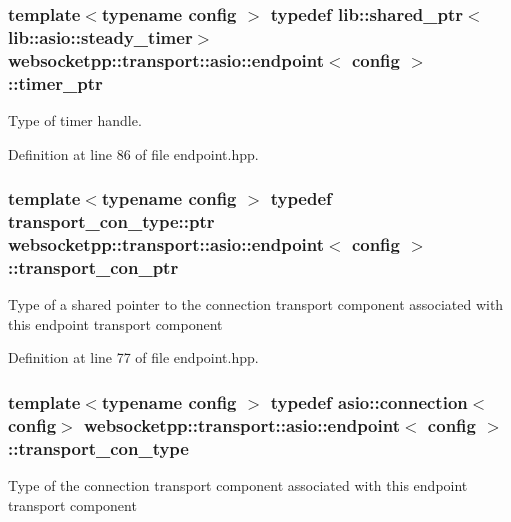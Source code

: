 \subsubsection[{timer\+\_\+ptr}]{\setlength{\rightskip}{0pt plus 5cm}template$<$typename config $>$ typedef lib\+::shared\+\_\+ptr$<${\bf lib\+::asio\+::steady\+\_\+timer}$>$ {\bf websocketpp\+::transport\+::asio\+::endpoint}$<$ config $>$\+::{\bf timer\+\_\+ptr}}\label{classwebsocketpp_1_1transport_1_1asio_1_1endpoint_a1802f5762009dbed117ff793fa87468f}


Type of timer handle. 



Definition at line 86 of file endpoint.\+hpp.

\hypertarget{classwebsocketpp_1_1transport_1_1asio_1_1endpoint_ac5fc306f32d15f92dd1b22366eaba62d}{}
\subsubsection[{transport\+\_\+con\+\_\+ptr}]{\setlength{\rightskip}{0pt plus 5cm}template$<$typename config $>$ typedef {\bf transport\+\_\+con\+\_\+type\+::ptr} {\bf websocketpp\+::transport\+::asio\+::endpoint}$<$ config $>$\+::{\bf transport\+\_\+con\+\_\+ptr}}\label{classwebsocketpp_1_1transport_1_1asio_1_1endpoint_ac5fc306f32d15f92dd1b22366eaba62d}
Type of a shared pointer to the connection transport component associated with this endpoint transport component 

Definition at line 77 of file endpoint.\+hpp.

\hypertarget{classwebsocketpp_1_1transport_1_1asio_1_1endpoint_a75f3102766fd3ba8230e99a2b0e00457}{}
\subsubsection[{transport\+\_\+con\+\_\+type}]{\setlength{\rightskip}{0pt plus 5cm}template$<$typename config $>$ typedef {\bf asio\+::connection}$<$config$>$ {\bf websocketpp\+::transport\+::asio\+::endpoint}$<$ config $>$\+::{\bf transport\+\_\+con\+\_\+type}}\label{classwebsocketpp_1_1transport_1_1asio_1_1endpoint_a75f3102766fd3ba8230e99a2b0e00457}
Type of the connection transport component associated with this endpoint transport component 

